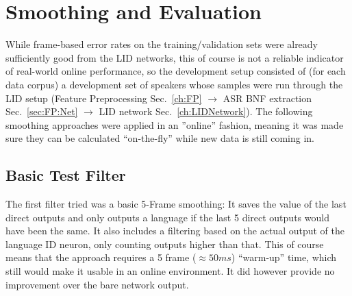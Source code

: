 \chapter{Smoothing and Evaluation}
\label{ch:eval}

While frame-based error rates on the training/validation sets were already sufficiently good from the LID networks, this of course is not a reliable indicator of real-world online performance, so the development setup consisted of (for each data corpus) a development set of speakers whose samples were run through the LID setup (Feature Preprocessing Sec.~\ref{ch:FP} $\rightarrow$ ASR BNF extraction Sec.~\ref{sec:FP:Net} $\rightarrow$ LID network Sec.~\ref{ch:LIDNetwork}). The following smoothing approaches were applied in an ''online'' fashion, meaning it was made sure they can be calculated ``on-the-fly'' while new data is still coming in.

\section{Basic Test Filter}
\label{sec:eval:basic}

The first filter tried was a basic 5-Frame smoothing: It saves the value of the last direct outputs and only outputs a language if the last 5 direct outputs would have been the same. It also includes a filtering based on the actual output of the language ID neuron, only counting outputs higher than that. This of course means that the approach requires a 5 frame (\(\approx 50 ms\)) ``warm-up'' time, which still would make it usable in an online environment. It did however provide no improvement over the bare network output.

